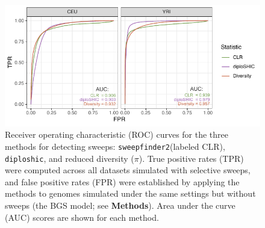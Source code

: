 \documentclass[hidelinks]{article}
\newcommand{\sweepfinder}{\texttt{sweepfinder2}\xspace}
\newcommand{\diploshic}{\texttt{diploshic}\xspace}
\begin{document}
\begin{figure}[h]
    \centering
    \includegraphics[width=0.8 \textwidth]{figures/sweeps/roc_neutral_null.pdf}
    \caption{
    \label{fig:roc-curves}
    Receiver operating characteristic (ROC) curves for the three methods for detecting sweeps:
    \sweepfinder (labeled CLR), \diploshic, and reduced diversity ($\pi$).
    True positive rates (TPR) were computed across all datasets simulated with selective sweeps,
    and false positive rates (FPR) were established by applying the methods to genomes simulated
    under the same settings but without sweeps (the BGS model; see \textbf{Methods}).
    Area under the curve (AUC) scores are shown for each method.
    }
\end{figure}
\end{document}
